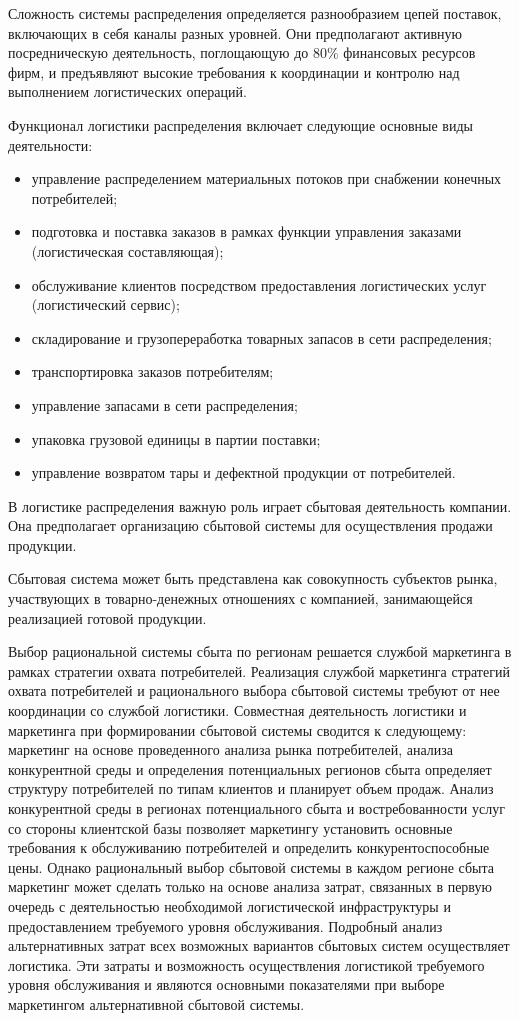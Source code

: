 Сложность системы распределения определяется разнообразием цепей поставок, включающих в себя каналы разных уровней.
Они предполагают активную посредническую деятельность, поглощающую до 80\% финансовых ресурсов фирм, и предъявляют высокие требования к координации и контролю над выполнением логистических операций.

Функционал логистики распределения включает следующие основные виды деятельности:
\begin{itemize}
	\item управление распределением материальных потоков при снабжении конечных потребителей;
	\item подготовка и поставка заказов в рамках функции управления заказами (логистическая составляющая);
	\item обслуживание клиентов посредством предоставления логистических услуг (логистический сервис);
	\item складирование и грузопереработка товарных запасов в сети распределения;
	\item транспортировка заказов потребителям;
	\item управление запасами в сети распределения;
	\item упаковка грузовой единицы в партии поставки;
	\item управление возвратом тары и дефектной продукции от потребителей.
\end{itemize}

В логистике распределения важную роль играет сбытовая деятельность компании.
Она предполагает организацию сбытовой системы для осуществления продажи продукции.

Сбытовая система может быть представлена как совокупность субъектов рынка, участвующих в товарно-денежных отношениях с компанией, занимающейся реализацией готовой продукции.

Выбор рациональной системы сбыта по регионам решается службой маркетинга в рамках стратегии охвата потребителей.
Реализация службой маркетинга стратегий охвата  потребителей и рационального выбора сбытовой системы требуют от нее координации со службой логистики.
Совместная деятельность логистики и маркетинга при формировании сбытовой системы сводится к следующему: маркетинг на основе проведенного анализа рынка потребителей, анализа конкурентной среды и определения потенциальных регионов сбыта определяет структуру потребителей по типам клиентов и планирует объем продаж.
Анализ конкурентной среды в регионах потенциального сбыта и востребованности услуг со стороны клиентской базы позволяет маркетингу установить основные требования к обслуживанию потребителей и определить конкурентоспособные цены.
Однако рациональный выбор сбытовой системы в каждом регионе сбыта маркетинг может сделать только на основе анализа затрат, связанных в первую очередь с деятельностью необходимой логистической инфраструктуры и предоставлением требуемого уровня обслуживания.
Подробный анализ альтернативных затрат всех возможных вариантов сбытовых систем осуществляет логистика.
Эти затраты и возможность осуществления логистикой требуемого уровня обслуживания и являются основными показателями при выборе маркетингом альтернативной сбытовой системы.

